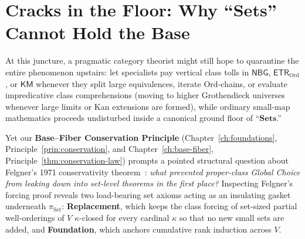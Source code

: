 \section{Cracks in the Floor: Why ``$\mathbf{Sets}$'' Cannot Hold the Base}\label{sec:cracks-in-the-floor}

At this juncture, a pragmatic category theorist might still hope to quarantine the entire phenomenon upstairs: let specialists pay vertical class tolls in $\mathsf{NBG}$, $\mathsf{ETR}_{\mathrm{Ord}}$, or $\mathsf{KM}$ whenever they split large equivalences, iterate $\mathrm{Ord}$-chains, or evaluate impredicative class comprehensions (moving to higher Grothendieck universes whenever large limits or Kan extensions are formed), while ordinary small-map mathematics proceeds undisturbed inside a canonical ground floor of ``$\mathbf{Sets}$.''

Yet our \textbf{Base--Fiber Conservation Principle} (Chapter~\ref{ch:foundations}, Principle~\ref{prin:conservation}, and Chapter~\ref{ch:base-fiber}, Principle~\ref{thm:conservation-law}) prompts a pointed structural question about Felgner's 1971 conservativity theorem~\cite{Felgner71}: \emph{what prevented proper-class Global Choice from leaking down into set-level theorems in the first place?} Inspecting Felgner's forcing proof reveals two load-bearing set axioms acting as an insulating gasket underneath $\pi_{\mathrm{Set}}$: \textbf{Replacement}, which keeps the class forcing of set-sized partial well-orderings of $V$ $\kappa$-closed for every cardinal $\kappa$ so that no new small sets are added, and \textbf{Foundation}, which anchors cumulative rank induction across $V$.

